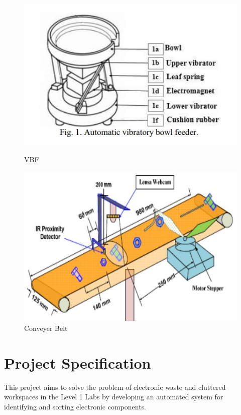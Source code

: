 \begin{figure}[t]
  \begin{minipage}[t]{0.45\textwidth}
    \centering
    \includegraphics[width=\textwidth]{imgs/articles/feeder.jpg}
    \caption{VBF \citet{nam2019design}}
    \label{fig:feeder}
  \end{minipage}
  \hfill
  \begin{minipage}[t]{0.45\textwidth}
      \centering
      \includegraphics[width=\textwidth]{imgs/articles/conveyer.jpg}
      \caption{Conveyer Belt \citet{Dhenge2013MechanicalNS}}
      \label{fig:conveyer}
      \end{minipage}
\end{figure}
\section{Project Specification}
This project aims to solve the problem of electronic waste and cluttered workspaces in the Level 1 Labs
by developing an automated system for identifying and sorting electronic components.

